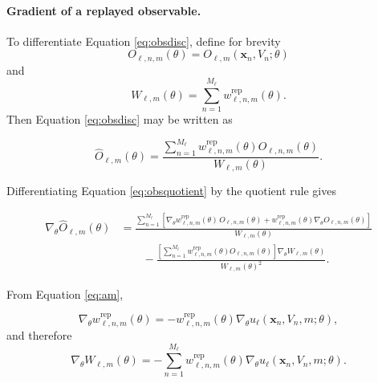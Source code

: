 \paragraph{Gradient of a replayed observable.}

To differentiate Equation \eqref{eq:obsdisc}, define for brevity
\[
    O_{\ell,n,m}(\theta)
    =
    O_{\ell,m}(\mathbf{x}_n, V_n; \theta)
\]
and
\[
    W_{\ell,m}(\theta)
    =
    \sum_{n=1}^{M_\ell}
    w^{\mathrm{rep}}_{\ell,n,m}(\theta).
\]
Then Equation \eqref{eq:obsdisc} may be written as

\begin{equation}
    \widehat{O}_{\ell,m}(\theta)
    =
    \frac{
        \sum_{n=1}^{M_\ell}
        w^{\mathrm{rep}}_{\ell,n,m}(\theta)
        O_{\ell,n,m}(\theta)
    }{
        W_{\ell,m}(\theta)
    }.
    \label{eq:obsquotient}
\end{equation}

Differentiating Equation \eqref{eq:obsquotient} by the quotient rule gives

\begin{align}
    \nabla_\theta \widehat{O}_{\ell,m}(\theta)
    &=
    \frac{
        \sum_{n=1}^{M_\ell}
        \left[
            \nabla_\theta
            w^{\mathrm{rep}}_{\ell,n,m}(\theta)
            \,
            O_{\ell,n,m}(\theta)
            +
            w^{\mathrm{rep}}_{\ell,n,m}(\theta)
            \nabla_\theta O_{\ell,n,m}(\theta)
        \right]
    }{
        W_{\ell,m}(\theta)
    }
    \nonumber \\
    &\qquad -
    \frac{
        \left[
            \sum_{n=1}^{M_\ell}
            w^{\mathrm{rep}}_{\ell,n,m}(\theta)
            O_{\ell,n,m}(\theta)
        \right]
        \nabla_\theta W_{\ell,m}(\theta)
    }{
        W_{\ell,m}(\theta)^2
    }.
    \label{eq:obsquotientgrad}
\end{align}

From Equation \eqref{eq:am},

\begin{equation}
    \nabla_\theta
    w^{\mathrm{rep}}_{\ell,n,m}(\theta)
    =
    -
    w^{\mathrm{rep}}_{\ell,n,m}(\theta)
    \nabla_\theta
    u_\ell(\mathbf{x}_n, V_n, m; \theta),
    \label{eq:obsweightgrad}
\end{equation}
%
and therefore
%
\begin{equation}
    \nabla_\theta W_{\ell,m}(\theta)
    =
    -
    \sum_{n=1}^{M_\ell}
    w^{\mathrm{rep}}_{\ell,n,m}(\theta)
    \nabla_\theta
    u_\ell(\mathbf{x}_n, V_n, m; \theta).
    \label{eq:obsdenomgrad}
\end{equation}

